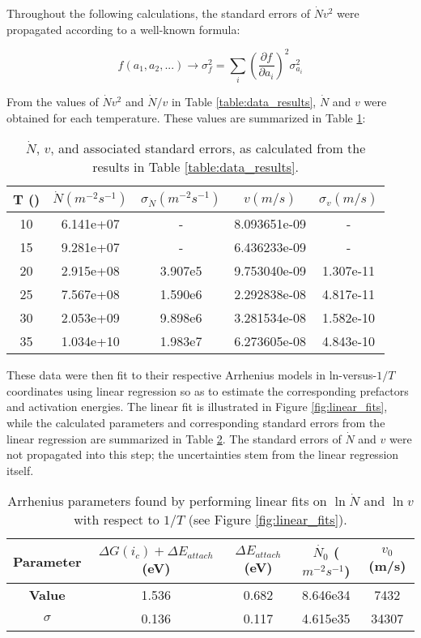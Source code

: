 Throughout the following calculations, the standard errors of $\dot{N}v^2$ were propagated according to a well-known formula:

	\begin{equation}
		f(a_1, a_2, ...) \rightarrow \sigma^2_f = \sum_i \left( \frac{\partial f}{\partial a_i} \right)^2 \sigma^2_{a_i}
		\label{eqn:se}
	\end{equation}

From the values of $\dot{N}v^2$ and $\dot{N}/v$ in Table \ref{table:data_results}, $\dot{N}$ and $v$ were obtained for each temperature.  These values are summarized in Table \ref{table:nv_results}:

	\begin{table}[h!]
	\centering
	\begin{tabular}{|c c c c c |} 
	\hline
		T (\textdegree{C}) & $\dot{N}(m^{-2}s^{-1})$ & $\sigma_{\dot{N}}(m^{-2}s^{-1})$ & $v (m/s)$ & $\sigma_{v} (m/s)$ \\ 
	\hline
		10 & 6.141e+07 & - & 8.093651e-09 & -\\ 
		15 & 9.281e+07 & - & 6.436233e-09 & -\\
		20 & 2.915e+08 & 3.907e5 & 9.753040e-09 & 1.307e-11\\
		25 & 7.567e+08 & 1.590e6 & 2.292838e-08 & 4.817e-11\\
		30 & 2.053e+09 & 9.898e6 & 3.281534e-08 & 1.582e-10\\
		35 & 1.034e+10 & 1.983e7 & 6.273605e-08 & 4.843e-10\\
	\hline
	\end{tabular}
		\caption{$\dot{N}$, $v$, and associated standard errors, as calculated from the results in Table \ref{table:data_results}.} 
	\label{table:nv_results}
	\end{table}

These data were then fit to their respective Arrhenius models in ln-versus-$1/T$ coordinates using linear regression so as to estimate the corresponding prefactors and activation energies.  The linear fit is illustrated in Figure \ref{fig:linear_fits}, while the calculated parameters and corresponding standard errors from the linear regression are summarized in Table \ref{table:parameter_results}.  The standard errors of $\dot{N}$ and $v$ were not propagated into this step; the uncertainties stem from the linear regression itself.

	\begin{table}[h!]
	\centering
	\begin{tabular}{|c | c | c | c | c |} 
		\hline
		\textbf{Parameter} & $\Delta G(i_c) + \Delta E_{attach}$ (eV) & $\Delta E_{attach}$ (eV) & $\dot{N_0}$ ($m^{-2}s^{-1}$) & $v_0$ (m/s) \\ 
		\hline
		\textbf{Value} & 1.536 & 0.682 & 8.646e34 & 7432 \\
		\textbf{$\sigma$} & 0.136 & 0.117 & 4.615e35 & 34307 \\
		\hline
	\end{tabular}
		\caption{Arrhenius parameters found by performing linear fits on $\ln{\dot{N}}$ and $\ln{v}$ with respect to $1/T$ (see Figure \ref{fig:linear_fits}).}
	\label{table:parameter_results}
	\end{table}


